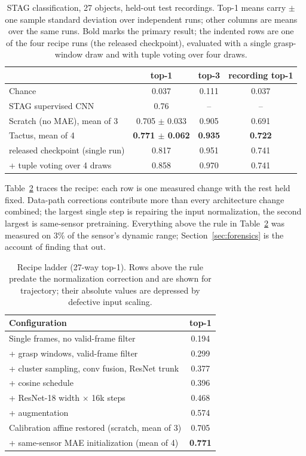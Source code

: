 \documentclass[conference]{IEEEtran}
\begin{document}
\begin{table}[h]
\centering
\caption{STAG classification, 27 objects, held-out test recordings. Top-1 means carry
$\pm$ one sample standard deviation over independent runs; other columns are means over
the same runs. Bold marks the primary result; the indented rows are one of the four
recipe runs (the released checkpoint), evaluated with a single grasp-window draw and with
tuple voting over four draws.}
\label{tab:results}
\begin{tabular}{lccc}
\toprule
 & top-1 & top-3 & recording top-1 \\
\midrule
Chance & 0.037 & 0.111 & 0.037 \\
STAG supervised CNN~\cite{sundaram2019stag} & 0.76 & -- & -- \\
Scratch (no MAE), mean of 3 & 0.705 $\pm$ 0.033 & 0.905 & 0.691 \\
Tactus, mean of 4 & \textbf{0.771 $\pm$ 0.062} & \textbf{0.935} & \textbf{0.722} \\
\quad released checkpoint (single run) & 0.817 & 0.951 & 0.741 \\
\quad + tuple voting over 4 draws & 0.858 & 0.970 & 0.741 \\
\bottomrule
\end{tabular}
\end{table}

Table~\ref{tab:ladder} traces the recipe: each row is one measured change with the rest
held fixed. Data-path corrections contribute more than every architecture change combined;
the largest single step is repairing the input normalization, the second largest is
same-sensor pretraining. Everything above the rule in Table~\ref{tab:ladder} was measured
on 3\% of the sensor's dynamic range; Section~\ref{sec:forensics} is the account of
finding that out.

\begin{table}[h]
\centering
\caption{Recipe ladder (27-way top-1). Rows above the rule predate the normalization
correction and are shown for trajectory; their absolute values are depressed by defective
input scaling.}
\label{tab:ladder}
\begin{tabular}{lc}
\toprule
Configuration & top-1 \\
\midrule
Single frames, no valid-frame filter & 0.194 \\
+ grasp windows, valid-frame filter & 0.299 \\
+ cluster sampling, conv fusion, ResNet trunk & 0.377 \\
+ cosine schedule & 0.396 \\
+ ResNet-18 width $\times$ 16k steps & 0.468 \\
+ augmentation & 0.574 \\
\midrule
Calibration affine restored (scratch, mean of 3) & 0.705 \\
+ same-sensor MAE initialization (mean of 4) & \textbf{0.771} \\
\bottomrule
\end{tabular}
\end{table}
\end{document}
